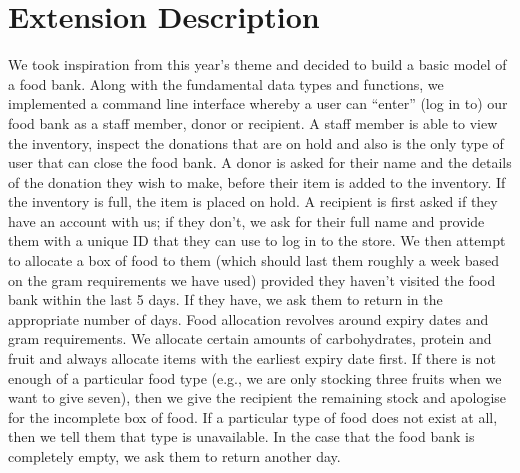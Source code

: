 \documentclass [10pt] {article}
\begin{document}
\section*{Extension Description}
We took inspiration from this year’s theme and decided to build a basic model of a food bank. Along with the fundamental data types and functions, we implemented a command line interface whereby a user can “enter” (log in to) our food bank as a staff member, donor or recipient.  A staff member is able to view the inventory, inspect the donations that are on hold and also is the only type of user that can close the food bank. A donor is asked for their name and the details of the donation they wish to make, before their item is added to the inventory. If the inventory is full, the item is placed on hold. A recipient is first asked if they have an account with us; if they don’t, we ask for their full name and provide them with a unique ID that they can use to log in to the store. We then attempt to allocate a box of food to them (which should last them roughly a week based on the gram requirements we have used) provided they haven’t visited the food bank within the last 5 days. If they have, we ask them to return in the appropriate number of days. Food allocation revolves around expiry dates and gram requirements. We allocate certain amounts of carbohydrates, protein and fruit and always allocate items with the earliest expiry date first. If there is not enough of a particular food type (e.g., we are only stocking three fruits when we want to give seven), then we give the recipient the remaining stock and apologise for the incomplete box of food. If a particular type of food does not exist at all, then we tell them that type is unavailable. In the case that the food bank is completely empty, we ask them to return another day. 
\end{document}
